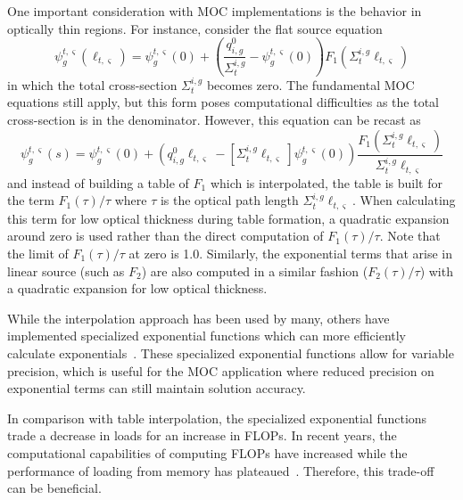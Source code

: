 One important consideration with \ac{MOC} implementations is the behavior in optically thin regions. For instance, consider the flat source equation
\begin{equation*}
	\psi_g^{t,\varsigma}(\ell_{t,\varsigma}) = \psi^{t,\varsigma}_g(0) + \left( \frac{q^0_{i,g}}{\Sigma_{t}^{i,g}} - \psi_g^{t,\varsigma}(0) \right) F_1\left(\Sigma_{t}^{i,g} \ell_{t,\varsigma} \right)
\end{equation*}
in which the total cross-section $\Sigma_{t}^{i,g}$ becomes zero. The fundamental \ac{MOC} equations still apply, but this form poses computational difficulties as the total cross-section is in the denominator. However, this equation can be recast as
\begin{equation}
	\psi_g^{t,\varsigma}(s) = \psi^{t,\varsigma}_g(0) + \left(q^0_{i,g} \ell_{t,\varsigma} - \left[\Sigma_{t}^{i,g} \ell_{t,\varsigma}\right]\psi_g^{t,\varsigma}(0) \right) \frac{F_1\left(\Sigma_{t}^{i,g} \ell_{t,\varsigma} \right)}{\Sigma_{t}^{i,g} \ell_{t,\varsigma}}
\end{equation}
and instead of building a table of $F_1$ which is interpolated, the table is built for the term $F_1(\tau) / \tau$ where $\tau$ is the optical path length $\Sigma_{t}^{i,g} \ell_{t,\varsigma}$. When calculating this term for low optical thickness during table formation, a quadratic expansion around zero is used rather than the direct computation of $F_1(\tau) / \tau$. Note that the limit of $F_1(\tau) / \tau$ at zero is 1.0. Similarly, the exponential terms that arise in linear source (such as $F_2$) are also computed in a similar fashion ($F_2(\tau) / \tau$) with a quadratic expansion for low optical thickness.

While the interpolation approach has been used by many, others have implemented specialized exponential functions which can more efficiently calculate exponentials~\cite{colin-exp}. These specialized exponential functions allow for variable precision, which is useful for the \ac{MOC} application where reduced precision on exponential terms can still maintain solution accuracy. 

In comparison with table interpolation, the specialized exponential functions trade a decrease in loads for an increase in \acp{FLOP}. In recent years, the computational capabilities of computing \acp{FLOP} have increased while the performance of loading from memory has plateaued~\cite{Patterson_1997}. Therefore, this trade-off can be beneficial.

